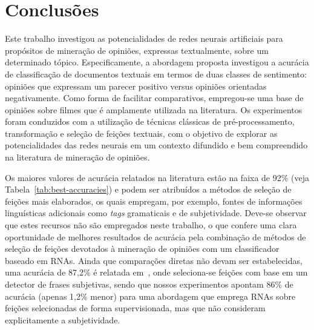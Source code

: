 \documentclass[11pt,a4paper]{article}
\begin{document}


\section{Conclusões}\label{sec:conclusions}

Este trabalho investigou as potencialidades de redes neurais artificiais para propósitos de mineração de opiniões, expressas textualmente, sobre um determinado tópico. Especificamente, a abordagem proposta investigou a acurácia de classificação de documentos textuais em termos de duas classes de sentimento: opiniões que expressam um parecer positivo versus opiniões orientadas negativamente. Como forma de facilitar comparativos, empregou-se uma base de opiniões sobre filmes que é amplamente utilizada na literatura. Os experimentos foram conduzidos com a utilização de técnicas clássicas de pré-processamento, transformação e seleção de feições textuais, com o objetivo de explorar as potencialidades das redes neurais em um contexto difundido e bem compreendido na literatura de mineração de opiniões.


Os maiores valores de acurácia relatados na literatura estão na faixa de 92\% (veja Tabela~\ref{tab:best-accuracies}) e podem ser atribuídos a métodos de seleção de feições mais elaborados, os quais empregam, por exemplo, fontes de informações linguísticas adicionais como \textit{tags} gramaticais e de subjetividade. Deve-se observar que estes recursos não são empregados neste trabalho, o que confere uma clara oportunidade de melhores resultados de acurácia pela combinação de métodos de seleção de feições devotados à mineração de opiniões com um classificador baseado em RNAs. Ainda que comparações diretas não devam ser estabelecidas, uma acurácia de 87,2\% é relatada em~\cite{Pang04:Subjectivity}, onde seleciona-se feições com base em um detector de frases subjetivas, sendo que nossos experimentos apontam 86\% de acurácia (apenas 1,2\% menor) para uma abordagem que emprega RNAs sobre feições selecionadas de forma supervisionada, mas que não consideram explicitamente a subjetividade.
\end{document}
